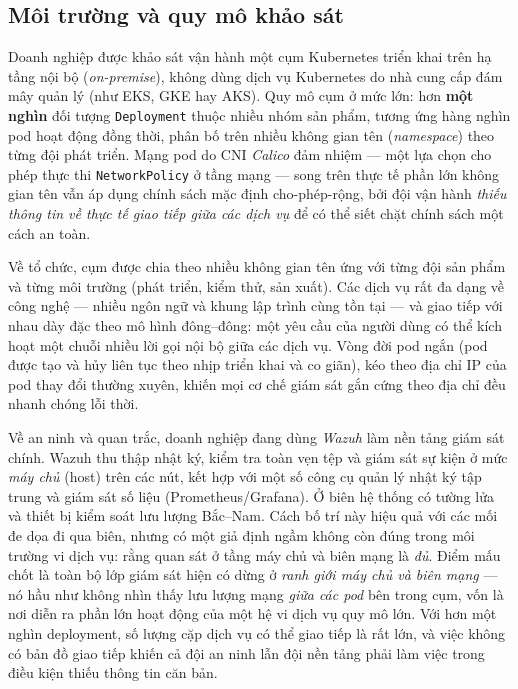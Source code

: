 \subsection{Môi trường và quy mô khảo sát}
\label{subsec:env-survey}

Doanh nghiệp được khảo sát vận hành một cụm Kubernetes triển khai trên hạ tầng nội bộ
(\textit{on-premise}), không dùng dịch vụ Kubernetes do nhà cung cấp đám mây quản lý (như
EKS, GKE hay AKS). Quy mô cụm ở mức lớn: hơn \textbf{một nghìn} đối tượng \texttt{Deployment}
thuộc nhiều nhóm sản phẩm, tương ứng hàng nghìn pod hoạt động đồng thời, phân bố trên
nhiều không gian tên (\textit{namespace}) theo từng đội phát triển. Mạng pod do CNI
\emph{Calico} đảm nhiệm --- một lựa chọn cho phép thực thi \texttt{NetworkPolicy} ở tầng
mạng --- song trên thực tế phần lớn không gian tên vẫn áp dụng chính sách mặc định
cho-phép-rộng, bởi đội vận hành \emph{thiếu thông tin về thực tế giao tiếp giữa các dịch
vụ} để có thể siết chặt chính sách một cách an toàn.

Về tổ chức, cụm được chia theo nhiều không gian tên ứng với từng đội sản phẩm và từng môi
trường (phát triển, kiểm thử, sản xuất). Các dịch vụ rất đa dạng về công nghệ --- nhiều
ngôn ngữ và khung lập trình cùng tồn tại --- và giao tiếp với nhau dày đặc theo mô hình
đông--đông: một yêu cầu của người dùng có thể kích hoạt một chuỗi nhiều lời gọi nội bộ
giữa các dịch vụ. Vòng đời pod ngắn (pod được tạo và hủy liên tục theo nhịp triển khai và
co giãn), kéo theo địa chỉ IP của pod thay đổi thường xuyên, khiến mọi cơ chế giám sát gắn
cứng theo địa chỉ đều nhanh chóng lỗi thời.

Về an ninh và quan trắc, doanh nghiệp đang dùng \emph{Wazuh} làm nền tảng giám sát chính.
Wazuh thu thập nhật ký, kiểm tra toàn vẹn tệp và giám sát sự kiện ở mức \emph{máy chủ}
(host) trên các nút, kết hợp với một số công cụ quản lý nhật ký tập trung và giám sát số
liệu (Prometheus/Grafana). Ở biên hệ thống có tường lửa và thiết bị kiểm soát lưu lượng
Bắc--Nam. Cách bố trí này hiệu quả với các mối đe dọa đi qua biên, nhưng có một giả định
ngầm không còn đúng trong môi trường vi dịch vụ: rằng quan sát ở tầng máy chủ và biên mạng
là \emph{đủ}. Điểm mấu chốt là toàn bộ lớp giám sát hiện có dừng ở \emph{ranh giới máy chủ
và biên mạng} --- nó hầu như không nhìn thấy lưu lượng mạng \emph{giữa các pod} bên trong
cụm, vốn là nơi diễn ra phần lớn hoạt động của một hệ vi dịch vụ quy mô lớn. Với hơn một
nghìn deployment, số lượng cặp dịch vụ có thể giao tiếp là rất lớn, và việc không có bản đồ
giao tiếp khiến cả đội an ninh lẫn đội nền tảng phải làm việc trong điều kiện thiếu thông
tin căn bản.

